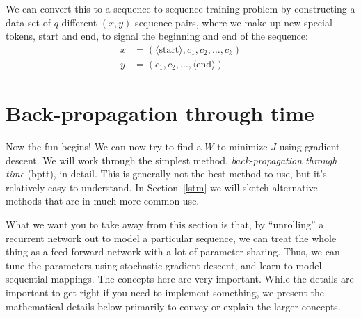 We can convert this to a sequence-to-sequence training problem by
constructing a data set of $q$ different $(x, y)$ sequence pairs, where we make up
new special tokens, $\text{start}$ and $\text{end}$, to signal the
beginning and end of the sequence:
\begin{align}
  x & = (\langle\text{start}\rangle, c_1, c_2, \ldots, c_k) \\
  y & = (c_1, c_2, \dots, \langle\text{end}\rangle)
\end{align}





\section{Back-propagation through time}
\label{sec-bptt}

Now the fun begins!  We can now try to find a $W$ to minimize $J$
using gradient descent.  We will work through the simplest method,
{\em back-propagation through time} ({\sc bptt}), in detail.  This is generally not the best
method to use, but it's relatively easy to understand.  In
Section~\ref{lstm} we will sketch alternative methods that are in much
more common use.

\bigskip
\begin{noticebox}
  What we want you to take away from this section is that, by
  ``unrolling'' a recurrent network out to model a particular
  sequence, we can treat the whole thing as a feed-forward network
  with a lot of parameter sharing.  Thus, we can tune the parameters
  using stochastic gradient descent, and learn to model sequential
  mappings.  The concepts here are very important.  While the details
  are important to get right if you need to implement something, we
  present the mathematical details below primarily to convey or
  explain the larger concepts.
\end{noticebox}


